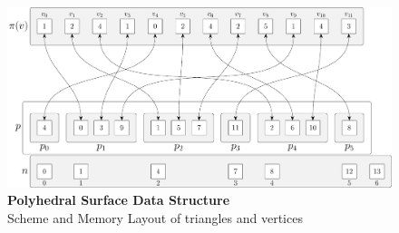 \documentclass{stdlocal}
\begin{document}
  \begin{figure}[h]
    \centering
    \includegraphics[width=\linewidth]{figures/polyhedral-surface-topological-vertex-map.pdf}
    \caption[Polyhedral Surface Data Structure]{%
      \textbf{Polyhedral Surface Data Structure}\\
      Scheme and Memory Layout of triangles and vertices
    }
  \end{figure}
\end{document}
